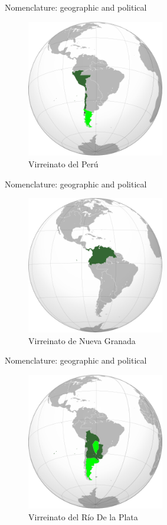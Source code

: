 \documentclass{beamer}
\begin{document}
\begin{frame}{Nomenclature: geographic and political}
\begin{figure}
\includegraphics[width=6cm]{figures/vice_peru.png}
\caption{Virreinato del Per\'{u}}
\end{figure}
\end{frame}

\begin{frame}{Nomenclature: geographic and political}
\begin{figure}
\includegraphics[width=6cm]{figures/vice_nuevagranada.png}
\caption{Virreinato de Nueva Granada}
\end{figure}
\end{frame}

\begin{frame}{Nomenclature: geographic and political}
\begin{figure}
\includegraphics[width=6cm]{figures/vice_riodelaplata.png}
\caption{Virreinato del R\'{i}o De la Plata}
\end{figure}
\end{frame}
\end{document}
